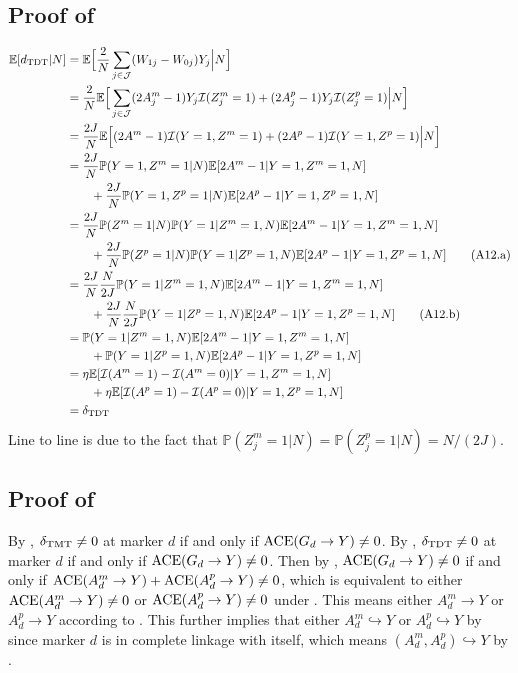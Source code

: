 \documentclass[12pt]{extarticle}
\newcommand{\pp}{\mathbb{P}}
\newcommand{\E}{\mathbb{E}}
\newcommand{\nind}{J}
\newcommand{\indicator}{\mathcal{I}}
\newcommand{\ace}{{\normalfont \text{ACE}}}
\newcommand{\tmt}{{\normalfont \text{TMT}}}
\newcommand{\tdt}{{\normalfont \text{TDT}}}
\newcommand{\cJ}{\mathcal{J}}
\begin{document}
{{\subsection{Proof of } \label{app:tdt_ace}

{\allowdisplaybreaks 
\begin{align}
\E[d_{\tdt}|N] &= \E\Big[\frac{2}{N}\sum_{j\in \cJ}(W_{1j}-W_{0j})Y_j\Big|N\Big]\nonumber \\
& = \frac{2}{N}\E\Big[\sum_{j\in \cJ}(2A^m_j-1)Y_j\indicator(Z^m_j=1) + (2A^p_j-1)Y_j\indicator(Z^p_j=1)\Big|N\Big] \nonumber \\
& = \frac{2\nind}{N} \E\Big[(2A^m-1)\indicator(Y=1,Z^m=1) + (2A^p-1)\indicator(Y=1,Z^p=1)\Big|N\Big] \nonumber \\
& = \frac{2\nind}{N} \pp(Y=1,Z^m=1|N) \E[2A^m-1|Y=1,Z^m=1,N] ~ \nonumber \\
& \qquad + \frac{2\nind}{N} \pp(Y=1,Z^p=1|N) \E[2A^p-1|Y=1,Z^p=1,N] \nonumber \\
& = \frac{2\nind}{N} \pp(Z^m=1|N) \pp(Y=1|Z^m=1,N) \E[2A^m-1|Y=1,Z^m=1,N] ~ \nonumber \\
& \qquad + \frac{2\nind}{N} \pp(Z^p=1|N) \pp(Y=1|Z^p=1,N) \E[2A^p-1|Y=1,Z^p=1,N] \tag{A12.a} \label{eq:lem11_a} \\
& = \frac{2\nind}{N} \frac{N}{2\nind} \pp(Y=1|Z^m=1,N) \E[2A^m-1|Y=1,Z^m=1,N] ~ \nonumber \\
& \qquad + \frac{2\nind}{N} \frac{N}{2\nind} \pp(Y=1|Z^p=1,N) \E[2A^p-1|Y=1,Z^p=1,N] \tag{A12.b} \label{eq:lem11_b} \\
& =  \pp(Y=1|Z^m=1,N) \E[2A^m-1|Y=1,Z^m=1,N] ~ \nonumber \\
& \qquad + \pp(Y=1|Z^p=1,N) \E[2A^p-1|Y=1,Z^p=1,N] \nonumber \\
& = \eta \E[\indicator(A^m=1)-\indicator(A^m=0)|Y=1,Z^m=1,N] \nonumber \\
& \qquad + \eta \E[\indicator(A^p=1)-\indicator(A^p=0)|Y=1,Z^p=1,N] \nonumber \\
& = \delta_{\tdt} \nonumber
\end{align}}
Line  to line  is due to the fact that $\pp(Z^m_j=1 | N) = \pp(Z^p_j=1 | N) = N/(2J)$. 

\subsection{Proof of } \label{app:causal_link}

By , $\delta_{\tmt}\neq 0$ at marker $d$ if and only if $\ace(G_d\to Y)\neq 0$. By , $\delta_{\tdt}\neq 0$ at marker $d$ if and only if $\ace(G_d\to Y)\neq 0$. Then by , $\ace(G_d\to Y)\neq 0$ if and only if $\ace(A^m_d\to Y)+\ace(A^p_d\to Y)\neq 0$, which is equivalent to either $\ace(A^m_d\to Y)\neq 0$ or $\ace(A^p_d\to Y)\neq 0$ under . This means either $A^m_d\to Y$ or $A^p_d\to Y$ according to . This further implies that either $A^m_d \hookrightarrow Y$ or $A^p_d \hookrightarrow Y$ by  since marker $d$ is in complete linkage with itself, which means $(A^m_d,A^p_d) \hookrightarrow Y$ by .

}}
\end{document}
